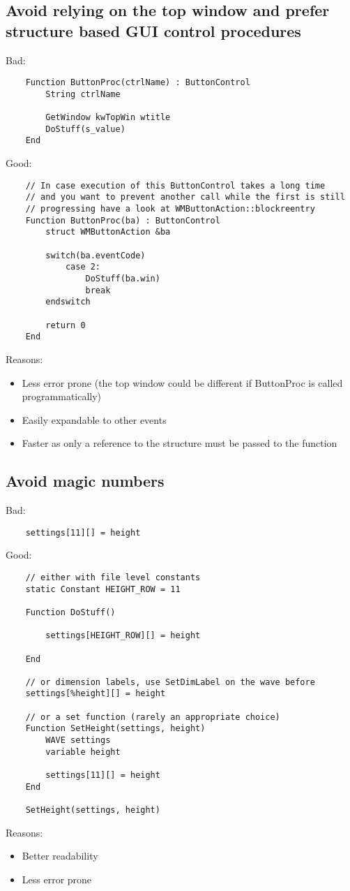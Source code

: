 \documentclass{scrartcl}
\begin{document}
\subsection{Avoid relying on the top window and prefer structure based GUI control procedures}
Bad:
\begin{verbatim}
	Function ButtonProc(ctrlName) : ButtonControl
		String ctrlName

		GetWindow kwTopWin wtitle
		DoStuff(s_value)
	End
\end{verbatim}
Good:
\begin{verbatim}
	// In case execution of this ButtonControl takes a long time
	// and you want to prevent another call while the first is still
	// progressing have a look at WMButtonAction::blockreentry
	Function ButtonProc(ba) : ButtonControl
		struct WMButtonAction &ba

		switch(ba.eventCode)
			case 2:
				DoStuff(ba.win)
				break
		endswitch

		return 0
	End
\end{verbatim}
Reasons:
\begin{itemize}
  \item Less error prone (the top window could be different if ButtonProc is called programmatically)
  \item Easily expandable to other events
  \item Faster as only a reference to the structure must be passed to the function
\end{itemize}
% 
\subsection{Avoid magic numbers}
Bad:
\begin{verbatim}
	settings[11][] = height
\end{verbatim}
Good:
\begin{verbatim}
	// either with file level constants
	static Constant HEIGHT_ROW = 11

	Function DoStuff()
	
		settings[HEIGHT_ROW][] = height
	
	End

	// or dimension labels, use SetDimLabel on the wave before
	settings[%height][] = height

	// or a set function (rarely an appropriate choice)
	Function SetHeight(settings, height)
		WAVE settings
		variable height

		settings[11][] = height
	End

	SetHeight(settings, height)
\end{verbatim}
Reasons:
\begin{itemize}
	\item Better readability
	\item Less error prone
\end{itemize}
% 
\end{document}
